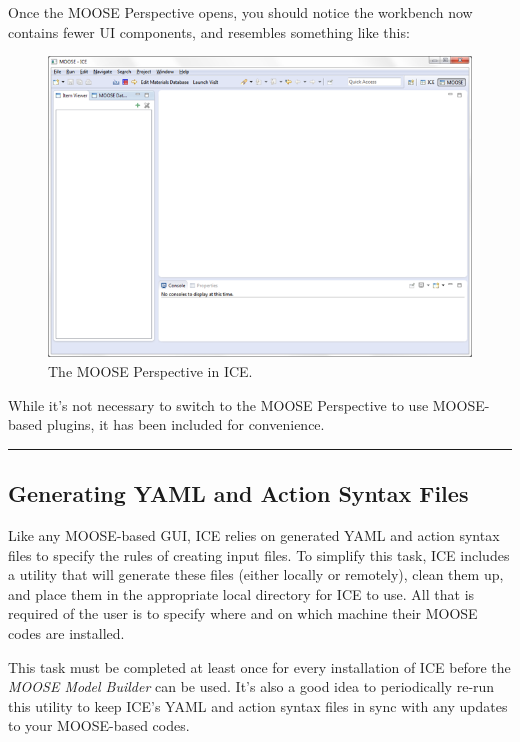 Once the MOOSE Perspective opens, you should notice the workbench now
contains fewer UI components, and resembles something like this:

\begin{figure}[htbp]
\centering
\includegraphics[width=\textwidth]{figures/ICE_MOOSEPerspective.png}
\caption{The MOOSE Perspective in ICE.}
\end{figure}

While it's not necessary to switch to the MOOSE Perspective to use
MOOSE-based plugins, it has been included for convenience.

\begin{center}\rule{0.5\linewidth}{\linethickness}\end{center}

\subsection{Generating YAML and Action Syntax
Files}\label{generating-yaml-and-action-syntax-files}

Like any MOOSE-based GUI, ICE relies on generated YAML and action syntax
files to specify the rules of creating input files. To simplify this
task, ICE includes a utility that will generate these files (either
locally or remotely), clean them up, and place them in the appropriate
local directory for ICE to use. All that is required of the user is to
specify where and on which machine their MOOSE codes are installed.

This task must be completed at least once for every installation of ICE
before the \emph{MOOSE Model Builder} can be used. It's also a good idea
to periodically re-run this utility to keep ICE's YAML and action syntax
files in sync with any updates to your MOOSE-based codes.

